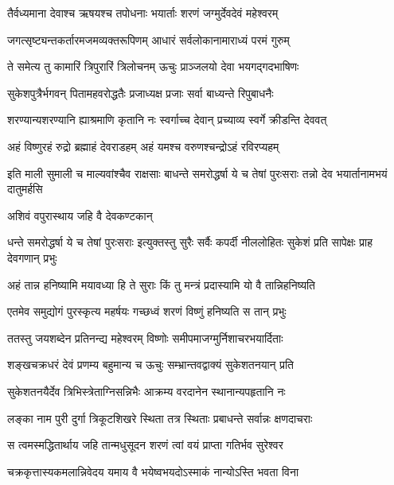 
\twolineshloka
{तैर्वध्यमाना देवाश्च ऋषयश्च तपोधनाः}
{भयार्ताः शरणं जग्मुर्देवदेवं महेश्वरम्} %

\twolineshloka
{जगत्सृष्ट्यन्तकर्तारमजमव्यक्तरूपिणम्}
{आधारं सर्वलोकानामाराध्यं परमं गुरुम्} %

\twolineshloka
{ते समेत्य तु कामारिं त्रिपुरारिं त्रिलोचनम्}
{ऊचुः प्राञ्जलयो देवा भयगद्गदभाषिणः} %

\twolineshloka
{सुकेशपुत्रैर्भगवन् पितामहवरोद्धतैः}
{प्रजाध्यक्ष प्रजाः सर्वा बाध्यन्ते रिपुबाधनैः} %

\twolineshloka
{शरण्यान्यशरण्यानि ह्याश्रमाणि कृतानि नः}
{स्वर्गाच्च देवान् प्रच्याव्य स्वर्गे क्रीडन्ति देववत्} %

\twolineshloka
{अहं विष्णुरहं रुद्रो ब्रह्माहं देवराडहम्}
{अहं यमश्च वरुणश्चन्द्रोऽहं रविरप्यहम्} %

\threelineshloka
{इति माली सुमाली च माल्यवांश्चैव राक्षसाः}
{बाधन्ते समरोद्धर्षा ये च तेषां पुरःसराः}
{तन्नो देव भयार्तानामभयं दातुमर्हसि} %

\onelineshloka
{अशिवं वपुरास्थाय जहि वै देवकण्टकान्} %

\threelineshloka
{धन्ते समरोद्धर्षा ये च तेषां पुरःसराः}
{इत्युक्तस्तु सुरैः सर्वैः कपर्दी नीललोहितः}
{सुकेशं प्रति सापेक्षः प्राह देवगणान् प्रभुः} %

\twolineshloka
{अहं तान्न हनिष्यामि मयावध्या हि ते सुराः}
{किं तु मन्त्रं प्रदास्यामि यो वै तान्निहनिष्यति} %

\twolineshloka
{एतमेव समुद्योगं पुरस्कृत्य महर्षयः}
{गच्छध्वं शरणं विष्णुं हनिष्यति स तान् प्रभुः} %

\twolineshloka
{ततस्तु जयशब्देन प्रतिनन्द्य महेश्वरम्}
{विष्णोः समीपमाजग्मुर्निशाचरभयार्दिताः} %

\twolineshloka
{शङ्खचक्रधरं देवं प्रणम्य बहुमान्य च}
{ऊचुः सम्भ्रान्तवद्वाक्यं सुकेशतनयान् प्रति} %

\twolineshloka
{सुकेशतनयैर्देव त्रिभिस्त्रेताग्निसन्निभैः}
{आक्रम्य वरदानेन स्थानान्यपहृतानि नः} %

\twolineshloka
{लङ्का नाम पुरी दुर्गा त्रिकूटशिखरे स्थिता}
{तत्र स्थिताः प्रबाधन्ते सर्वान्नः क्षणदाचराः} %

\twolineshloka
{स त्वमस्मद्धितार्थाय जहि तान्मधुसूदन}
{शरणं त्वां वयं प्राप्ता गतिर्भव सुरेश्वर} %

\twolineshloka
{चक्रकृत्तास्यकमलान्निवेदय यमाय वै}
{भयेष्वभयदोऽस्माकं नान्योऽस्ति भवता विना} %

